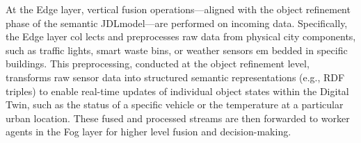 \documentclass[5p,times]{elsarticle}
\begin{document}


At the Edge layer, vertical fusion operations—aligned
 with the object refinement phase of the semantic JDLmodel—are
 performed on incoming data. Specifically, the Edge layer col
lects and preprocesses raw data from physical city components,
 such as traffic lights, smart waste bins, or weather sensors em
bedded in specific buildings. This preprocessing, conducted
 at the object refinement level, transforms raw sensor data into
 structured semantic representations (e.g., RDF triples) to enable
 real-time updates of individual object states within the Digital
 Twin, such as the status of a specific vehicle or the temperature at
 a particular urban location. These fused and processed streams
 are then forwarded to worker agents in the Fog layer for higher
level fusion and decision-making.




\end{document}
